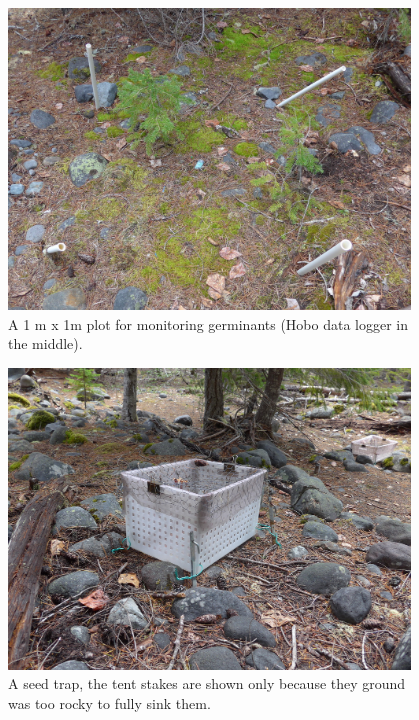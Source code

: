 \documentclass[11pt,letter]{article}
\begin{document}
\begin{figure}[h!]
\centering
\includegraphics[width=0.95\textwidth]{images/2020June17_Rainier188sm.jpg}
\caption{A 1 m x 1m plot for monitoring germinants (Hobo data logger in the middle).}
\label{fig:plot} 
\end{figure}


\begin{figure}[h!]
\centering
\includegraphics[width=0.95\textwidth]{images/2020June17_Rainier185sm.jpg}
\caption{A seed trap, the tent stakes are shown only because they ground was too rocky to fully sink them.}
\label{fig:seedtrap} 
\end{figure}
\end{document}
